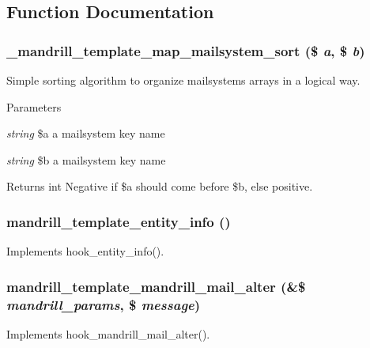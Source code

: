 \subsection{Function Documentation}
\hypertarget{mandrill__template_8module_a51089c73974e16c1b7c794f21f849534}{
\subsubsection[{\_\-mandrill\_\-template\_\-map\_\-mailsystem\_\-sort}]{\setlength{\rightskip}{0pt plus 5cm}\_\-mandrill\_\-template\_\-map\_\-mailsystem\_\-sort (\$ {\em a}, \/  \$ {\em b})}}
\label{mandrill__template_8module_a51089c73974e16c1b7c794f21f849534}
Simple sorting algorithm to organize mailsystems arrays in a logical way.


\begin{DoxyParams}{Parameters}
\item[{\em string}]\$a a mailsystem key name \item[{\em string}]\$b a mailsystem key name\end{DoxyParams}
\begin{DoxyReturn}{Returns}
int Negative if \$a should come before \$b, else positive. 
\end{DoxyReturn}
\hypertarget{mandrill__template_8module_a388c001a4f19bb5e890e5962d9a9481a}{
\subsubsection[{mandrill\_\-template\_\-entity\_\-info}]{\setlength{\rightskip}{0pt plus 5cm}mandrill\_\-template\_\-entity\_\-info ()}}
\label{mandrill__template_8module_a388c001a4f19bb5e890e5962d9a9481a}
Implements hook\_\-entity\_\-info(). \hypertarget{mandrill__template_8module_ab93754dd057f76eac9f42382cd35815e}{
\subsubsection[{mandrill\_\-template\_\-mandrill\_\-mail\_\-alter}]{\setlength{\rightskip}{0pt plus 5cm}mandrill\_\-template\_\-mandrill\_\-mail\_\-alter (\&\$ {\em mandrill\_\-params}, \/  \$ {\em message})}}
\label{mandrill__template_8module_ab93754dd057f76eac9f42382cd35815e}
Implements hook\_\-mandrill\_\-mail\_\-alter().


